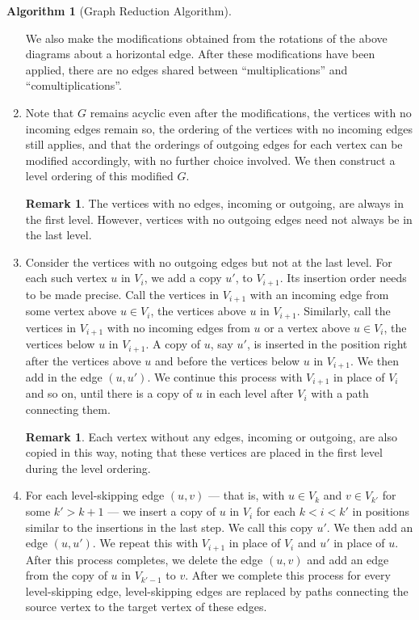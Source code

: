 \documentclass{amsart}
\numberwithin{thm}{section}
\theoremstyle{definition}
\newtheorem{rmk}[thm]{Remark}
\newtheorem{alg}[thm]{Algorithm}
\begin{document}
\begin{alg}[Graph Reduction Algorithm]
\begin{enumerate}
We also make the modifications obtained from the rotations of the above diagrams
about a horizontal edge. After these modifications have been applied, there are
no edges shared between ``multiplications'' and ``comultiplications''.

\item Note that $G$ remains acyclic even after the modifications, the vertices
with no incoming edges remain so, the ordering
of the vertices with no incoming edges still applies, and that the
orderings of outgoing edges for each vertex can be modified accordingly, with no
further choice involved. We then construct a
level ordering of this modified $G$.

\begin{rmk}
The vertices with no edges, incoming or outgoing, are always in the first level.
However, vertices with no outgoing edges need not always be in the last level.
\end{rmk}

\item\label{alg:edgeless}
Consider the vertices with no outgoing edges but not at the last level. For each
such vertex $u$ in $V_i$, we add a copy $u'$, to $V_{i + 1}$. Its insertion
order needs to be made precise. Call the vertices in $V_{i + 1}$ with an
incoming edge from some vertex above $u \in V_{i}$, the vertices above $u$ in
$V_{i + 1}$. Similarly, call the vertices in $V_{i + 1}$ with no incoming edges
from $u$ or a vertex above $u \in V_i$, the vertices below $u$ in $V_{i + 1}$.
A copy of $u$, say $u'$, is inserted
in the position right after the vertices above $u$ and before the vertices below
$u$ in $V_{i + 1}$. We then add in the edge $(u, u')$. We continue this process
with $V_{i + 1}$ in place of $V_i$ and so on, until there is a copy
of $u$ in each level after $V_i$ with a path connecting them.

\begin{rmk}
Each vertex without any edges, incoming or outgoing, are also copied in this
way, noting that these vertices are placed in the first level during the level
ordering.
\end{rmk}

\item For each level-skipping edge $(u, v)$ --- that is, with $u \in V_k$ and
$v \in V_{k'}$ for some $k' > k + 1$ --- we insert a copy of $u$ in $V_{i}$ for
each $k < i < k'$ in positions similar to the insertions in the last step. We
call this copy $u'$. We then add an edge $(u, u')$. We repeat this with
$V_{i + 1}$ in place of $V_{i}$ and $u'$ in place of $u$. After this process
completes, we delete the edge $(u, v)$ and add an edge from the copy of $u$
in $V_{k' - 1}$ to $v$. After we complete this process for every
level-skipping edge, level-skipping edges are replaced by paths connecting the
source vertex to the target vertex of these edges.


\end{enumerate}
\end{alg}
\end{document}
